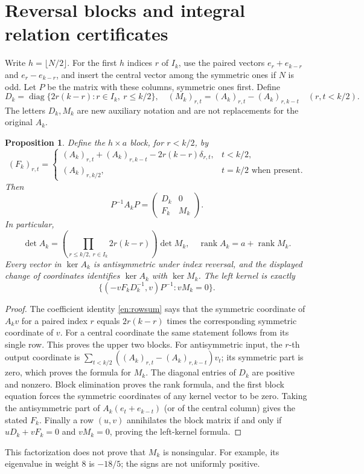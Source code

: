 \documentclass[12pt]{amsart}
\newtheorem{prop}[thm]{Proposition}
\theoremstyle{definition}
\theoremstyle{remark}
\numberwithin{equation}{section}
\newcommand{\rank}{\operatorname{rank}}
\theoremstyle{definition}
\theoremstyle{remark}
\begin{document}
\section{Reversal blocks and integral relation certificates}
Write $h=\lfloor N/2\rfloor$. For the first $h$ indices $r$ of $I_k$,
use the paired vectors $e_r+e_{k-r}$ and $e_r-e_{k-r}$, and insert the
central vector among the symmetric ones if $N$ is odd. Let $P$ be the
matrix with these columns, symmetric ones first. Define
\[
 D_k=\operatorname{diag}\{2r(k-r):r\in I_k,\ r\leq k/2\},
 \quad (M_k)_{r,t}=(A_k)_{r,t}-(A_k)_{r,k-t}\quad(r,t<k/2).
\]
The letters $D_k,M_k$ are new auxiliary notation and are not replacements
for the original $A_k$.
\begin{prop}\label{en:block}
Define the $h\times a$ block, for $r<k/2$, by
\[
 (F_k)_{r,t}=\begin{cases}
 (A_k)_{r,t}+(A_k)_{r,k-t}-2r(k-r)\delta_{r,t},&t<k/2,\\
 (A_k)_{r,k/2},&t=k/2\text{ when present}.
 \end{cases}
\]
Then
\[
 P^{-1}A_kP=\begin{pmatrix}D_k&0\\F_k&M_k\end{pmatrix}.
\]
In particular,
\[
 \det A_k=\left(\prod_{r\leq k/2,\ r\in I_k}2r(k-r)\right)\det M_k,
 \quad \rank A_k=a+\rank M_k.
\]
Every vector in $\ker A_k$ is antisymmetric under index reversal, and
the displayed change of coordinates identifies $\ker A_k$ with
$\ker M_k$. The left kernel is exactly
\[
 \{(-vF_kD_k^{-1},v)P^{-1}:vM_k=0\}.
\]
\end{prop}
\begin{proof}
The coefficient identity \eqref{en:rowsum} says that the symmetric
coordinate of $A_kv$ for a paired index $r$ equals $2r(k-r)$ times
the corresponding symmetric coordinate of $v$. For a central coordinate
the same statement follows from its single row. This proves the upper
two blocks. For antisymmetric input, the $r$-th output coordinate is
$\sum_{t<k/2}((A_k)_{r,t}-(A_k)_{r,k-t})v_t$; its symmetric part is zero,
which proves the formula for $M_k$. The diagonal entries of $D_k$ are
positive and nonzero. Block elimination proves the rank formula, and
the first block equation forces the symmetric coordinates of any kernel
vector to be zero. Taking the antisymmetric part of $A_k(e_t+e_{k-t})$
(or of the central column) gives the stated $F_k$. Finally a row
$(u,v)$ annihilates the block matrix if and only if
$uD_k+vF_k=0$ and $vM_k=0$, proving the left-kernel formula.
\end{proof}
This factorization does not prove that $M_k$ is nonsingular. For example,
its eigenvalue in weight $8$ is $-18/5$; the signs are not uniformly positive.
\end{document}
